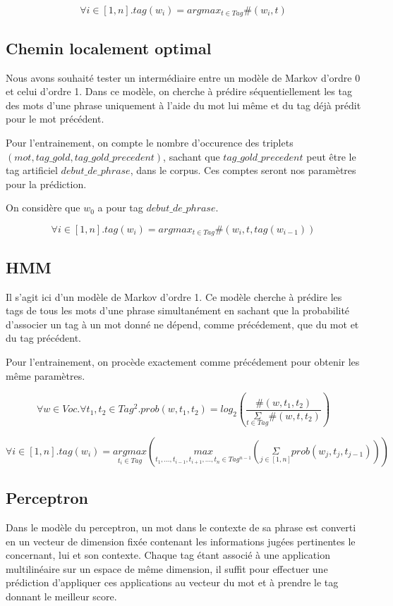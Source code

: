 \documentclass{article}
\begin{document}
$$\forall i \in [1,n] . tag(w_i) = argmax_{t \in Tag} \#(w_i,t)$$

\subsection{Chemin localement optimal}

Nous avons souhaité tester un intermédiaire entre un modèle de Markov d'ordre 0 et celui d'ordre 1. Dans ce modèle, on cherche à prédire séquentiellement les tag des mots d'une phrase uniquement à l'aide du mot lui même et du tag déjà prédit pour le mot précédent.

Pour l'entrainement, on compte le nombre d'occurence des triplets $(mot,tag\_gold,tag\_gold\_precedent)$, sachant que $tag\_gold\_precedent$ peut être le tag artificiel $debut\_de\_phrase$, dans le corpus. Ces comptes seront nos paramètres pour la prédiction.

On considère que $w_0$ a pour tag $debut\_de\_phrase$.

$$\forall i \in [1,n] . tag (w_i) = argmax_{t \in Tag} \#(w_i,t,tag(w_{i-1}))$$

\subsection{HMM}

Il s'agit ici d'un modèle de Markov d'ordre 1. Ce modèle cherche à prédire les tags de tous les mots d'une phrase simultanément en sachant que la probabilité d'associer un tag à un mot donné ne dépend, comme précédement, que du mot et du tag précédent.

Pour l'entrainement, on procède exactement comme précédement pour obtenir les même paramètres.

$$\forall w \in Voc . \forall t_1,t_2 \in Tag^2 . prob(w,t_1,t_2) = log_2 \left( \frac{\#(w,t_1,t_2)}{\underset{t \in Tag}{\Sigma}\#(w,t,t_2)} \right) $$

$$\forall i \in [1,n] . tag(w_i) = \underset{t_i \in Tag}{argmax} \left( \underset{t_1,...,t_{i-1},t_{i+1},...,t_n \in Tag^{n-1}}{max} \left( \underset{j \in [1,n]}{\Sigma} prob(w_j,t_j,t_{j-1}) \right) \right)$$

\subsection{Perceptron}

Dans le modèle du perceptron, un mot dans le contexte de sa phrase est converti en un vecteur de dimension fixée contenant les informations jugées pertinentes le concernant, lui et son contexte. Chaque tag étant associé à une application multilinéaire sur un espace de même dimension, il suffit pour effectuer une prédiction d'appliquer ces applications au vecteur du mot et à prendre le tag donnant le meilleur score.
\end{document}
